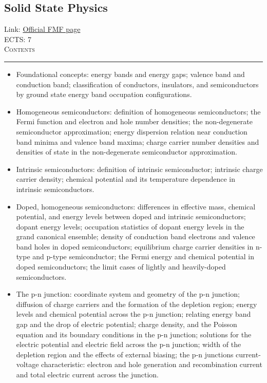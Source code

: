 \documentclass[11pt, a4paper]{article}
\newenvironment{course}[3]{
\subsection{#1}%
Link: \href{#2}{Official FMF page}\\%
ECTS: #3%
\vspace{1ex}
\\
{\large \textsc{Contents}}\\[-0.9ex]%
\rule{\textwidth}{0.5pt}
\vspace{-3ex}
}
{}
\newenvironment{chapter}[1]{
\begin{tcolorbox}[title=#1, breakable]
}
{\end{tcolorbox}}
\begin{document}
\begin{course}{Solid State Physics}{https://www.fmf.uni-lj.si/en/study-physics/programmes/1fiz/2020/7000777/courses/1138/}{7}
\begin{chapter}{Semiconductor physics}
\begin{itemize}
            \item Foundational concepts: energy bands and energy gaps; valence band and conduction band; classification of conductors, insulators, and semiconductors by ground state energy band occupation configurations.

            \item Homogeneous semiconductors: definition of homogeneous semiconductors; the Fermi function and electron and hole number densities; the non-degenerate semiconductor approximation; energy dispersion relation near conduction band minima and valence band maxima; charge carrier number densities and densities of state in the non-degenerate semiconductor approximation.

            \item Intrinsic semiconductors: definition of intrinsic semiconductor; intrinsic charge carrier density; chemical potential and its temperature dependence in intrinsic semiconductors.

            \item Doped, homogeneous semiconductors: differences in effective mass, chemical potential, and energy levels between doped and intrinsic semiconductors; dopant energy levels; occupation statistics of dopant energy levels in the grand canonical ensemble; density of conduction band electrons and valence band holes in doped semiconductors; equilibrium charge carrier densities in n-type and p-type semiconductor; the Fermi energy and chemical potential in doped semiconductors; the limit cases of lightly and heavily-doped semiconductors.

            \item The p-n junction: coordinate system and geometry of the p-n junction; diffusion of charge carriers and the formation of the depletion region; energy levels and chemical potential across the p-n junction; relating energy band gap and the drop of electric potential; charge density, and the Poisson equation and its boundary conditions in the p-n junction; solutions for the electric potential and electric field across the p-n junction; width of the depletion region and the effects of external biasing;
            the p-n junctions current-voltage characteristic: electron and hole generation and recombination current and total electric current across the junction.
        
        \end{itemize}
    \end{chapter}


\end{course}
\end{document}
